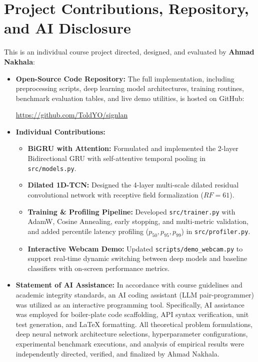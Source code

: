 \documentclass{article}
\begin{document}
\section*{Project Contributions, Repository, and AI Disclosure}
This is an individual course project directed, designed, and evaluated by \textbf{Ahmad Nakhala}:
\begin{itemize}
    \item \textbf{Open-Source Code Repository:} The full implementation, including preprocessing scripts, deep learning model architectures, training routines, benchmark evaluation tables, and live demo utilities, is hosted on GitHub:
    \begin{center}
        \url{https://github.com/ToldYO/signlan}
    \end{center}
    
    \item \textbf{Individual Contributions:}
    \begin{itemize}
        \item \textbf{BiGRU with Attention:} Formulated and implemented the 2-layer Bidirectional GRU with self-attentive temporal pooling in \texttt{src/models.py}.
        \item \textbf{Dilated 1D-TCN:} Designed the 4-layer multi-scale dilated residual convolutional network with receptive field formalization ($RF = 61$).
        \item \textbf{Training \& Profiling Pipeline:} Developed \texttt{src/trainer.py} with AdamW, Cosine Annealing, early stopping, and multi-metric validation, and added percentile latency profiling ($p_{50}, p_{95}, p_{99}$) in \texttt{src/profiler.py}.
        \item \textbf{Interactive Webcam Demo:} Updated \texttt{scripts/demo\_webcam.py} to support real-time dynamic switching between deep models and baseline classifiers with on-screen performance metrics.
    \end{itemize}

    \item \textbf{Statement of AI Assistance:}
    In accordance with course guidelines and academic integrity standards, an AI coding assistant (LLM pair-programmer) was utilized as an interactive programming tool. Specifically, AI assistance was employed for boiler-plate code scaffolding, API syntax verification, unit test generation, and LaTeX formatting. All theoretical problem formulations, deep neural network architecture selections, hyperparameter configurations, experimental benchmark executions, and analysis of empirical results were independently directed, verified, and finalized by Ahmad Nakhala.
\end{itemize}
\end{document}
